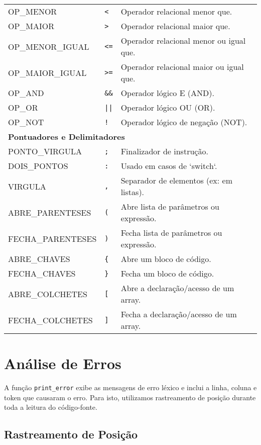 \documentclass[12pt,a4paper]{article}
\begin{document}
\begin{longtable}{lll}
OP\_MENOR & \texttt{<} & Operador relacional menor que. \\
OP\_MAIOR & \texttt{>} & Operador relacional maior que. \\
OP\_MENOR\_IGUAL & \texttt{<=} & Operador relacional menor ou igual que. \\
OP\_MAIOR\_IGUAL & \texttt{>=} & Operador relacional maior ou igual que. \\
OP\_AND & \texttt{\&\&} & Operador lógico E (AND). \\
OP\_OR & \texttt{||} & Operador lógico OU (OR). \\
OP\_NOT & \texttt{!} & Operador lógico de negação (NOT). \\
\midrule
\multicolumn{3}{l}{\textbf{Pontuadores e Delimitadores}} \\
\midrule
PONTO\_VIRGULA & \texttt{;} & Finalizador de instrução. \\
DOIS\_PONTOS & \texttt{:} & Usado em casos de `switch`. \\
VIRGULA & \texttt{,} & Separador de elementos (ex: em listas). \\
ABRE\_PARENTESES & \texttt{(} & Abre lista de parâmetros ou expressão. \\
FECHA\_PARENTESES & \texttt{)} & Fecha lista de parâmetros ou expressão. \\
ABRE\_CHAVES & \texttt{\{} & Abre um bloco de código. \\
FECHA\_CHAVES & \texttt{\}} & Fecha um bloco de código. \\
ABRE\_COLCHETES & \texttt{[} & Abre a declaração/acesso de um array. \\
FECHA\_COLCHETES & \texttt{]} & Fecha a declaração/acesso de um array. \\
\end{longtable}

\section{Análise de Erros}
\label{sec:err}

A função \texttt{print\_error} exibe as mensagens de erro léxico e inclui a linha, coluna e token que causaram o erro. Para isto, utilizamos rastreamento de posição durante toda a leitura do código-fonte.

\subsection{Rastreamento de Posição}
\end{document}
